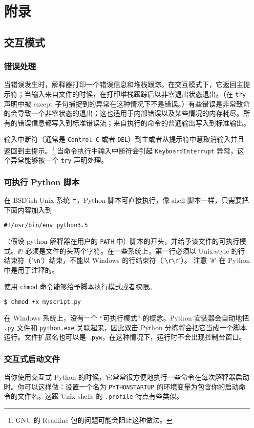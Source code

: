 \chapter{附录\label{Appendix}}
\section{交互模式\label{Appendix:InteractiveMode}}
\subsection{错误处理}
当错误发生时，解释器打印一个错误信息和堆栈跟踪。在交互模式下，它返回主提示符；当输入来自文件的时候，在打印堆栈跟踪后以非零退出状态退出。（在 \texttt{try} 声明中被 except 子句捕捉到的异常在这种情况下不是错误。）有些错误是非常致命的会导致一个非零状态的退出；这也适用于内部错误以及某些情况的内存耗尽。所有的错误信息都写入到标准错误流；来自执行的命令的普通输出写入到标准输出。

输入中断符（通常是 \texttt{Control-C} 或者 \texttt{DEL}）到主或者从提示符中慧取消输入并且返回到主提示。\footnote{GNU 的 Readline 包的问题可能会阻止这种做法。} 当命令执行中输入中断符会引起 \texttt{KeyboardInterrupt} 异常，这个异常能够被一个 \texttt{try} 声明处理。
\subsection{可执行 Python 脚本}
在 BSD’ish Unix 系统上，Python 脚本可直接执行，像 shell 脚本一样，只需要把下面内容加入到
\begin{lstlisting}
#!/usr/bin/env python3.5
\end{lstlisting}
（假设 python 解释器在用户的 \texttt{PATH} 中）脚本的开头，并给予该文件的可执行模式。\verb|#|! 必须是文件的头两个字符。在一些系统上，第一行必须以 Unix-style 的行结束符（'\verb|\n|'）结束，不能以 Windows 的行结束符（'\verb|\r\n|'）。 注意 '\verb|#|' 在 Python 中是用于注释的。

使用 \texttt{chmod} 命令能够给予脚本执行模式或者权限。

\verb|$ chmod +x myscript.py|

在 Windows 系统上，没有一个 “可执行模式” 的概念。Python 安装器会自动地把 \texttt{.py} 文件和 \texttt{python.exe} 关联起来，因此双击 Python 分拣将会把它当成一个脚本运行。文件扩展名也可以是 \texttt{.pyw}，在这种情况下，运行时不会出现控制台窗口。
\subsection{交互式启动文件}
当你使用交互式 Python 的时候，它常常很方便地执行一些命令在每次解释器启动时。你可以这样做：设置一个名为 \texttt{PYTHONSTARTUP} 的环境变量为包含你的启动命令的文件名。这跟 Unix shells 的 \texttt{.profile} 特点有些类似。

